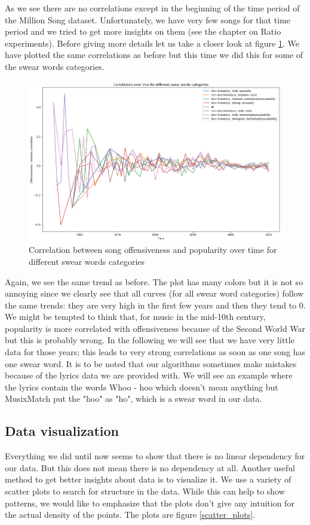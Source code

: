 \documentclass[11pt]{article}
\begin{document}
As we see there are no correlations except in the beginning of the time period of the Million Song dataset. Unfortunately, we have very few songs for that time period and we tried to get more insights on them (see the chapter on Ratio experiments). Before giving more details let us take a closer look at figure \ref{correlation_time_categories}. We have plotted the same correlations as before but this time we did this for some of the swear words categories.

\begin{figure}
\includegraphics[width=\linewidth]{plots/correlation_time_categories}
\caption{Correlation between song offensiveness and popularity over time for different swear words categories}
\label{correlation_time_categories}
\end{figure}

Again, we see the same trend as before. The plot has many colors but it is not so annoying since we clearly see that all curves (for all swear word categories) follow the same trends: they are very high in the first few years and then they tend to 0. We might be tempted to think that, for music in the mid-10th century, popularity is more correlated with offensiveness because of the Second World War but this is probably wrong. In the following we will see that we have very little data for those years; this leads to very strong correlations as soon as one song has one swear word. It is to be noted that our algorithms sometimes make mistakes because of the lyrics data we are provided with. We will see an example where the lyrics contain the words Whoo - hoo which doesn't mean anything but MusixMatch put the "hoo" as "ho", which is a swear word in our data.

\subsection{Data visualization}
Everything we did until now seems to show that there is no linear dependency for our data. 
But this does not mean there is no dependency at all. 
Another useful method to get better insights about data is to visualize it. 
We use a variety of scatter plots to search for structure in the data.
While this can help to show patterns, we would like to emphasize that the plots don't give any intuition for the actual density of the points.
The plots are figure \ref{scatter_plots}.
\end{document}
